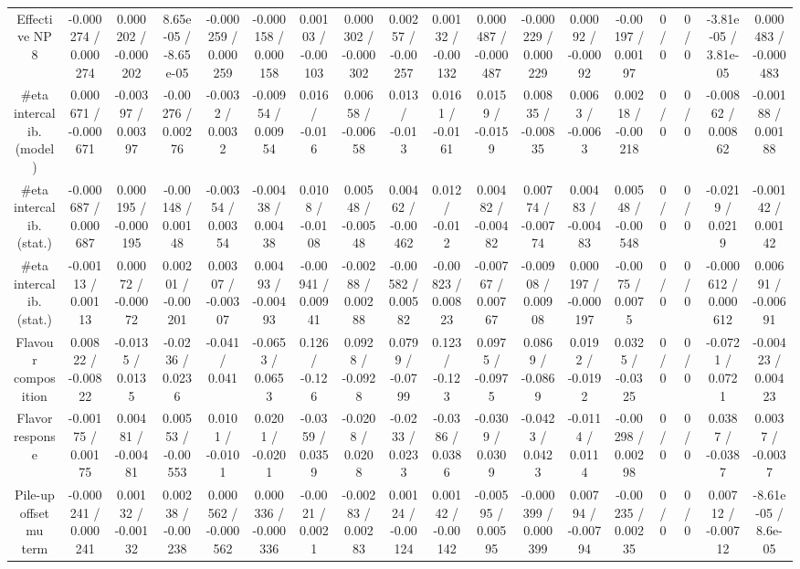 \documentclass[10pt]{article}
\begin{document}
\begin{table}[htbp]
\begin{center}
\begin{tabular}{|c|c|c|c|c|c|c|c|c|c|c|c|c|c|c|c|c|c|}
  Effective NP 8 & -0.000274 / 0.000274 & 0.000202 / -0.000202 & 8.65e-05 / -8.65e-05 & -0.000259 / 0.000259 & -0.000158 / 0.000158 & 0.00103 / -0.00103 & 0.000302 / -0.000302 & 0.00257 / -0.00257 & 0.00132 / -0.00132 & 0.000487 / -0.000487 & -0.000229 / 0.000229 & 0.00092 / -0.00092 & -0.00197 / 0.00197 & 0 / 0 & 0 / 0 & -3.81e-05 / 3.81e-05 & 0.000483 / -0.000483 \\ 
  #eta intercalib. (model) & 0.000671 / -0.000671 & -0.00397 / 0.00397 & -0.00276 / 0.00276 & -0.0032 / 0.0032 & -0.00954 / 0.00954 & 0.016 / -0.016 & 0.00658 / -0.00658 & 0.013 / -0.013 & 0.0161 / -0.0161 & 0.0159 / -0.0159 & 0.00835 / -0.00835 & 0.0063 / -0.0063 & 0.00218 / -0.00218 & 0 / 0 & 0 / 0 & -0.00862 / 0.00862 & -0.00188 / 0.00188 \\ 
  #eta intercalib. (stat.) & -0.000687 / 0.000687 & 0.000195 / -0.000195 & -0.00148 / 0.00148 & -0.00354 / 0.00354 & -0.00438 / 0.00438 & 0.0108 / -0.0108 & 0.00548 / -0.00548 & 0.00462 / -0.00462 & 0.012 / -0.012 & 0.00482 / -0.00482 & 0.00774 / -0.00774 & 0.00483 / -0.00483 & 0.00548 / -0.00548 & 0 / 0 & 0 / 0 & -0.0219 / 0.0219 & -0.00142 / 0.00142 \\ 
  #eta intercalib. (stat.) & -0.00113 / 0.00113 & 0.00072 / -0.00072 & 0.00201 / -0.00201 & 0.00307 / -0.00307 & 0.00493 / -0.00493 & -0.00941 / 0.00941 & -0.00288 / 0.00288 & -0.00582 / 0.00582 & -0.00823 / 0.00823 & -0.00767 / 0.00767 & -0.00908 / 0.00908 & 0.000197 / -0.000197 & -0.0075 / 0.0075 & 0 / 0 & 0 / 0 & -0.000612 / 0.000612 & 0.00691 / -0.00691 \\ 
  Flavour composition & 0.00822 / -0.00822 & -0.0135 / 0.0135 & -0.0236 / 0.0236 & -0.041 / 0.041 & -0.0653 / 0.0653 & 0.126 / -0.126 & 0.0928 / -0.0928 & 0.0799 / -0.0799 & 0.123 / -0.123 & 0.0975 / -0.0975 & 0.0869 / -0.0869 & 0.0192 / -0.0192 & 0.0325 / -0.0325 & 0 / 0 & 0 / 0 & -0.0721 / 0.0721 & -0.00423 / 0.00423 \\ 
  Flavor response & -0.00175 / 0.00175 & 0.00481 / -0.00481 & 0.00553 / -0.00553 & 0.0101 / -0.0101 & 0.0201 / -0.0201 & -0.0359 / 0.0359 & -0.0208 / 0.0208 & -0.0233 / 0.0233 & -0.0386 / 0.0386 & -0.0309 / 0.0309 & -0.0423 / 0.0423 & -0.0114 / 0.0114 & -0.00298 / 0.00298 & 0 / 0 & 0 / 0 & 0.0387 / -0.0387 & 0.0037 / -0.0037 \\ 
  Pile-up offset mu term & -0.000241 / 0.000241 & 0.00132 / -0.00132 & 0.00238 / -0.00238 & 0.000562 / -0.000562 & 0.000336 / -0.000336 & -0.0021 / 0.0021 & -0.00283 / 0.00283 & 0.00124 / -0.00124 & 0.00142 / -0.00142 & -0.00595 / 0.00595 & -0.000399 / 0.000399 & 0.00794 / -0.00794 & -0.00235 / 0.00235 & 0 / 0 & 0 / 0 & 0.00712 / -0.00712 & -8.61e-05 / 8.6e-05 \\ 

\end{tabular}
\end{center}
\end{table}
\end{document}

